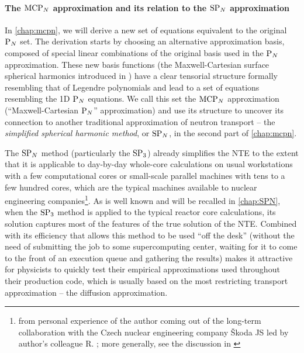 \paragraph{The $\MCPN$ approximation and its relation to the $\SPN$ approximation} 
In \cref{chap:mcpn}, we will derive a new set of equations equivalent to the original $\PN$ set. The
derivation starts by choosing an alternative approximation basis, composed of special linear combinations of the
original basis used in the $\PN$ approximation. These new basis functions (the Maxwell-Cartesian surface spherical
harmonics introduced in \cite{Applequist2}) have a clear tensorial structure formally resembling that of Legendre polynomials
and lead to a set of equations resembling the 1D $\PN$ equations. We call this set the $\MCPN$ approximation
(``Maxwell-Cartesian $\PN$'' approximation)
and use its structure to uncover its connection to another traditional approximation of neutron transport -- the
\textit{simplified spherical harmonic method}, or $\SPN$, in the second part of \cref{chap:mcpn}. 

The $\SPN$ method (particularly the $\SPN[3]$) already simplifies the NTE to the extent that it is applicable to
day-by-day whole-core calculations on usual workstations with a few computational cores or small-scale parallel machines
with tens to a few hundred cores, which are the typical machines available to nuclear engineering
companies\footnote{\label{sjsexp}from personal experience of the author coming out of the long-term collaboration with
the Czech nuclear engineering company {\v S}koda JS led by author's colleague R. \Kuzel; more generally, see the
discussion in \cite[Sec.
2.4]{Sanchez7}}. As is well known and will be recalled in \cref{chap:SPN}, when the $\SPN[3]$ method is applied to the
typical reactor core calculations, its solution captures most of the features of the true solution of the NTE. Combined
with its efficiency that allows this method to be used ``off the desk'' (without the need of submitting the job to some
supercomputing center, waiting for it to come to the front of an execution queue and gathering the results) makes it
attractive for physicists to quickly test their empirical approximations used throughout their production code, which is
usually based on the most restricting transport approximation -- the diffusion approximation.

